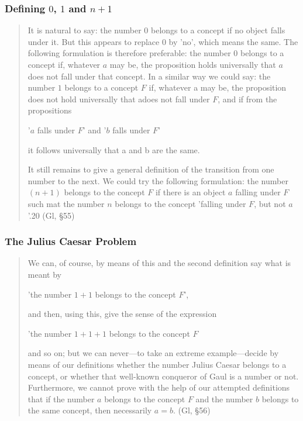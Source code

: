 \documentclass[compress,12pt]{beamer}
\begin{document}
\begin{frame}
    \frametitle{Defining $0$, $1$ and $n+1$}
    \small
    \begin{quote}
        It is natural to say: the number $0$ belongs to a concept if no object falls under it. But this appears to replace $0$ by 'no', which means the same. The following formulation is therefore preferable: the number $0$ belongs to a concept if, whatever $a$ may be, the proposition holds universally that $a$ does not fall under that concept. In a similar way we could say: the number $1$ belongs to a concept $F$ if, whatever a may be, the proposition does not hold universally that adoes not fall under $F$, and if from the propositions
        
        '$a$ falls under $F$' and '$b$ falls under $F$'
        
        it follows universally that a and b are the same.
        
        It still remains to give a general definition of the transition from one number to the next. We could try the following formulation: the number $(n + 1)$ belongs to the concept $F$ if there is an object $a$ falling under $F$ such mat the number $n$ belongs to the concept 'falling under $F$, but not $a$'.20 (Gl, \S55)
    \end{quote}
\end{frame}

\begin{frame}
    \frametitle{The Julius Caesar Problem}
    \begin{quote}
        We can, of course, by means of this and the second definition say what is meant by
        
        'the number $1 + 1$ belongs to the concept $F$',
        
        and then, using this, give the sense of the expression
        
        'the number $1 + 1 + 1$ belongs to the concept $F$
        
        and so on; but we can never---to take an extreme example---decide by means of our definitions whether the number \textup{Julius Caesar} belongs to a concept, or whether that well-known conqueror of Gaul is a number or not. Furthermore, we cannot prove with the help of our attempted definitions that if the number $a$ belongs to the concept $F$ and the number $b$ belongs to the same concept, then necessarily $a = b$.  (Gl, \S56)
    \end{quote}
\end{frame}
\end{document}
